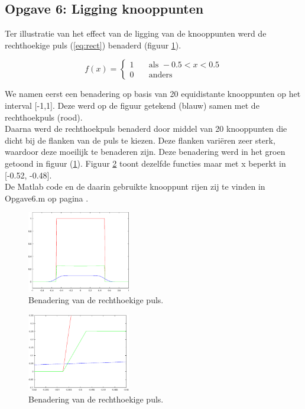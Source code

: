 \documentclass[a4paper]{article}
\newcommand{\opgave}[1]{\subsection{Opgave #1}}
\begin{document}
\opgave{6: Ligging knooppunten}\label{sec:oef6}
Ter illustratie van het effect van de ligging van de knooppunten werd de rechthoekige puls (\ref{eq:rect}) benaderd (figuur  \ref{fig:rectan}).

\begin{equation}
f(x) =
  \begin{cases}
    1       & \quad \text{als } -0.5 < x < 0.5\\
    0  & \quad \text{anders }
  \end{cases}
  \label{eq:rect}
\end{equation}

We namen eerst een benadering op basis van 20 equidistante knooppunten op het interval [-1,1]. Deze werd op de figuur getekend (blauw) samen met de rechthoekpuls (rood). \\

Daarna werd de rechthoekpuls benaderd door middel van 20 knooppunten die dicht bij de flanken van de puls te kiezen. Deze flanken vari\"eren zeer sterk, waardoor deze moeilijk te benaderen zijn. Deze benadering werd in het groen getoond in figuur (\ref{fig:rectan}). Figuur \ref{fig:rectanZoom} toont dezelfde functies maar met x beperkt in [-0.52, -0.48]. \\

De Matlab code en de daarin gebruikte knooppunt rijen zij te vinden in Opgave6.m op pagina \pageref{sec:code6}.
\begin{figure}[H]
	\begin{center} 
		\includegraphics[width=0.4\textwidth]{Rectan.eps}
	\end{center}
	\caption{Benadering van de rechthoekige puls.}
	\label{fig:rectan}
\end{figure}

\begin{figure}[H]
	\begin{center} 
		\includegraphics[width=0.4\textwidth]{RectanZoom.eps}
	\end{center}
	\caption{Benadering van de rechthoekige puls.}
	\label{fig:rectanZoom}
\end{figure}
\newpage
\end{document}
